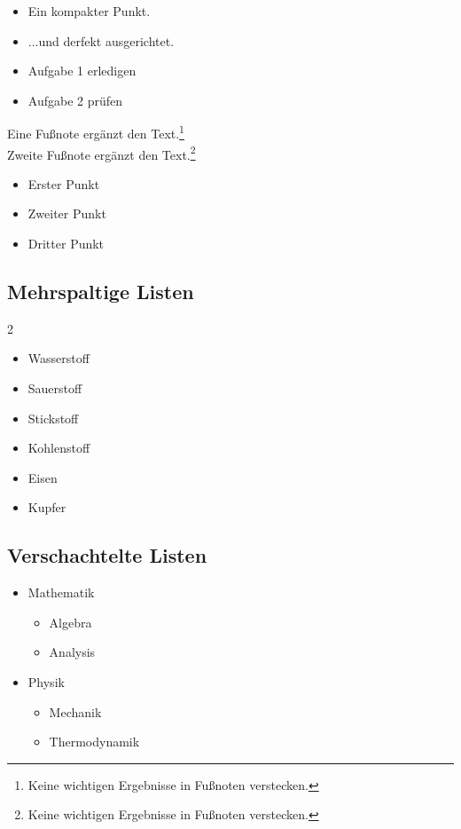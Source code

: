 \documentclass{scrartcl}
\begin{document}
\begin{itemize}[label=\textendash, nosep, leftmargin=*]
	\item Ein kompakter Punkt.
	\item ...und derfekt ausgerichtet.
\end{itemize}

\begin{itemize}[label=$\square$, itemsep=1ex] %
	\item Aufgabe 1 erledigen
	\item Aufgabe 2 prüfen
\end{itemize}


Eine Fußnote ergänzt den Text.\footnote{Keine wichtigen Ergebnisse in Fußnoten verstecken.}\\
Zweite Fußnote ergänzt den Text.\footnote{Keine wichtigen Ergebnisse in Fußnoten verstecken.}

\begin{itemize}[
	label=$\scriptscriptstyle\blacksquare$,
	itemsep=2pt,
	topsep=3pt,
	leftmargin=1.5em,
	labelsep=0.5em
	]
	\item Erster Punkt
	\item Zweiter Punkt
	\item Dritter Punkt
\end{itemize}

\subsection{Mehrspaltige Listen}

\begin{multicols}{2}
	\begin{itemize}[nosep]
		\item Wasserstoff
		\item Sauerstoff
		\item Stickstoff
		\item Kohlenstoff
		\item Eisen
		\item Kupfer
	\end{itemize}
\end{multicols}


\subsection{Verschachtelte Listen}
\begin{itemize}[label=$\bullet$]
	\item Mathematik
	\begin{itemize}[label=$\circ$]
		\item Algebra
		\item Analysis
	\end{itemize}
	
	\item Physik
	\begin{itemize}[label=$\scriptscriptstyle\blacksquare$]
		\item Mechanik
		\item Thermodynamik
	\end{itemize}
\end{itemize}
\end{document}
